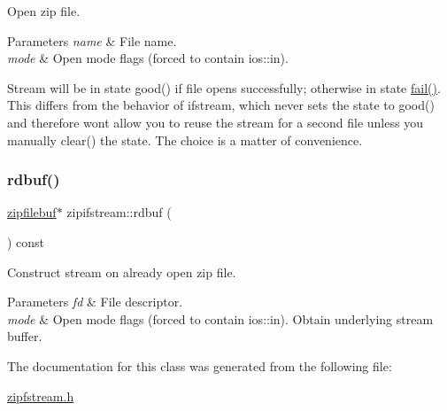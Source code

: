 Open zip file. 


\begin{DoxyParams}{Parameters}
{\em name} & File name. \\
\hline
{\em mode} & Open mode flags (forced to contain ios\+::in).\\
\hline
\end{DoxyParams}
Stream will be in state good() if file opens successfully; otherwise in state \hyperlink{_constraint_macros_8h_a73a3b169ac8c3419cbe15327e75ffcfd}{fail()}. This differs from the behavior of ifstream, which never sets the state to good() and therefore won\textquotesingle{}t allow you to reuse the stream for a second file unless you manually clear() the state. The choice is a matter of convenience. \mbox{\label{classzipifstream_a76e1d4362bfd964b7149c5d1b5f74726}} 
\subsubsection{\texorpdfstring{rdbuf()}{rdbuf()}}
{\footnotesize\ttfamily \hyperlink{classzipfilebuf}{zipfilebuf}$\ast$ zipifstream\+::rdbuf (\begin{DoxyParamCaption}{ }\end{DoxyParamCaption}) const\hspace{0.3cm}{\ttfamily [inline]}}



Construct stream on already open zip file. 


\begin{DoxyParams}{Parameters}
{\em fd} & File descriptor. \\
\hline
{\em mode} & Open mode flags (forced to contain ios\+::in). Obtain underlying stream buffer. \\
\hline
\end{DoxyParams}


The documentation for this class was generated from the following file\+:\begin{DoxyCompactItemize}
\item 
\hyperlink{zipfstream_8h}{zipfstream.\+h}\end{DoxyCompactItemize}
